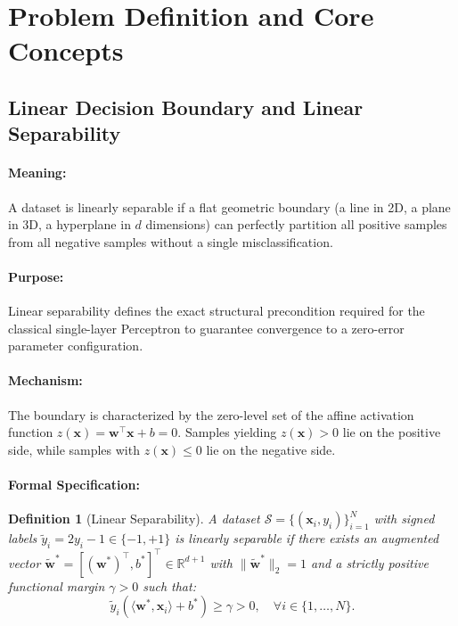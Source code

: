 \documentclass[11pt]{article}
\newtheorem{definition}{Definition}
\begin{document}
\section{Problem Definition and Core Concepts}
\label{sec:problem_definition}

\subsection{Linear Decision Boundary and Linear Separability}

\paragraph{Meaning:} A dataset is linearly separable if a flat geometric boundary (a line in 2D, a plane in 3D, a hyperplane in $d$ dimensions) can perfectly partition all positive samples from all negative samples without a single misclassification.

\paragraph{Purpose:} Linear separability defines the exact structural precondition required for the classical single-layer Perceptron to guarantee convergence to a zero-error parameter configuration.

\paragraph{Mechanism:} The boundary is characterized by the zero-level set of the affine activation function $z(\mathbf{x}) = \mathbf{w}^\top \mathbf{x} + b = 0$. Samples yielding $z(\mathbf{x}) > 0$ lie on the positive side, while samples with $z(\mathbf{x}) \le 0$ lie on the negative side.

\paragraph{Formal Specification:}
\begin{definition}[Linear Separability]
A dataset $\mathcal{S} = \{(\mathbf{x}_i, y_i)\}_{i=1}^N$ with signed labels $\tilde{y}_i = 2y_i - 1 \in \{-1, +1\}$ is \emph{linearly separable} if there exists an augmented vector $\tilde{\mathbf{w}}^* = [(\mathbf{w}^*)^\top, b^*]^\top \in \mathbb{R}^{d+1}$ with $\|\tilde{\mathbf{w}}^*\|_2 = 1$ and a strictly positive functional margin $\gamma > 0$ such that:
\begin{equation}
\label{eq:separability_condition}
\tilde{y}_i \left( \langle \mathbf{w}^*, \mathbf{x}_i \rangle + b^* \right) \ge \gamma > 0, \quad \forall i \in \{1, \dots, N\}.
\end{equation}
\end{definition}
\end{document}
